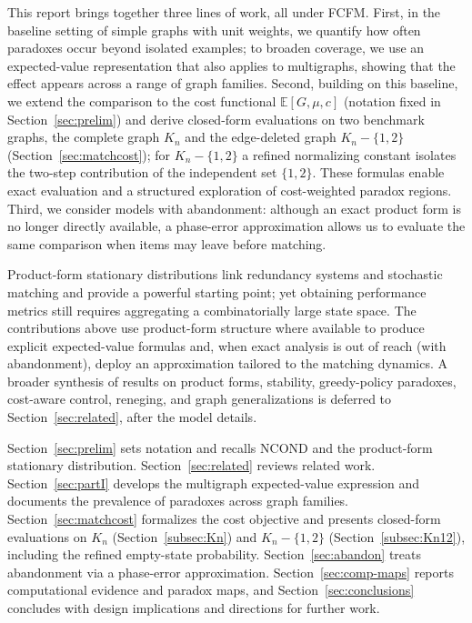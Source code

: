 \documentclass[11pt]{article}
\begin{document}
{This report brings together three lines of work, all under \textsc{FCFM}. 
First, in the baseline setting of simple graphs with unit weights, we quantify how often paradoxes occur beyond isolated examples; to broaden coverage, we use an expected-value representation that also applies to multigraphs, showing that the effect appears across a range of graph families. 
Second, building on this baseline, we extend the comparison to the cost functional $\mathbb{E}[G,\mu,c]$ (notation fixed in Section~\ref{sec:prelim}) and derive closed-form evaluations on two benchmark graphs, the complete graph $K_n$ and the edge-deleted graph $K_n-\{1,2\}$ (Section~\ref{sec:matchcost}); for $K_n-\{1,2\}$ a refined normalizing constant isolates the two-step contribution of the independent set $\{1,2\}$. These formulas enable exact evaluation and a structured exploration of cost-weighted paradox regions. 
Third, we consider models with abandonment: although an exact product form is no longer directly available, a phase-error approximation allows us to evaluate the same comparison when items may leave before matching.

Product-form stationary distributions link redundancy systems and stochastic matching and provide a powerful starting point; yet obtaining performance metrics still requires aggregating a combinatorially large state space. The contributions above use product-form structure where available to produce explicit expected-value formulas and, when exact analysis is out of reach (with abandonment), deploy an approximation tailored to the matching dynamics. A broader synthesis of results on product forms, stability, greedy-policy paradoxes, cost-aware control, reneging, and graph generalizations is deferred to Section~\ref{sec:related}, after the model details.

Section~\ref{sec:prelim} sets notation and recalls \textsc{NCOND} and the product-form stationary distribution. Section~\ref{sec:related} reviews related work. Section~\ref{sec:partI} develops the multigraph expected-value expression and documents the prevalence of paradoxes across graph families. Section~\ref{sec:matchcost} formalizes the cost objective and presents closed-form evaluations on $K_n$ (Section~\ref{subsec:Kn}) and $K_n-\{1,2\}$ (Section~\ref{subsec:Kn12}), including the refined empty-state probability. Section~\ref{sec:abandon} treats abandonment via a phase-error approximation. Section~\ref{sec:comp-maps} reports computational evidence and paradox maps, and Section~\ref{sec:conclusions} concludes with design implications and directions for further work.

}
\end{document}
